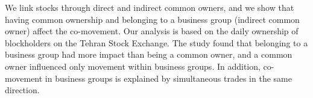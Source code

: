  We link stocks through direct and indirect common owners, and we show that having common ownership and belonging to a business group (indirect common owner) affect the co-movement. Our analysis is based on the daily ownership of blockholders on the Tehran Stock Exchange. The study found that belonging to a business group had more impact than being a common owner, and a common owner influenced only movement within business groups. In addition, co-movement in business groups is explained by simultaneous trades in the same direction.
